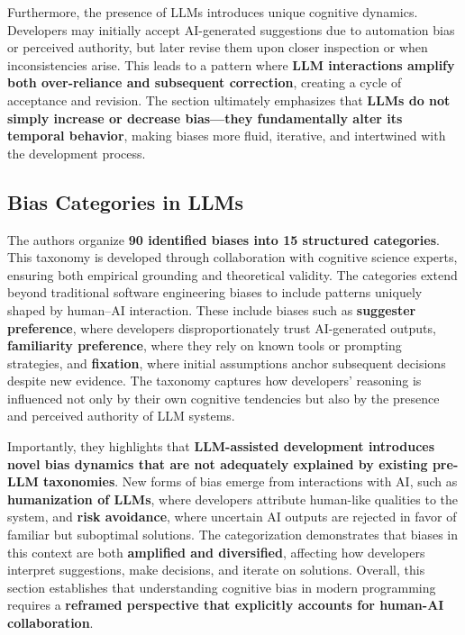Furthermore, the presence of LLMs introduces unique cognitive dynamics. Developers may initially accept AI-generated suggestions due to automation bias or perceived authority, but later revise them upon closer inspection or when inconsistencies arise. This leads to a pattern where \textbf{LLM interactions amplify both over-reliance and subsequent correction}, creating a cycle of acceptance and revision. The section ultimately emphasizes that \textbf{LLMs do not simply increase or decrease bias—they fundamentally alter its temporal behavior}, making biases more fluid, iterative, and intertwined with the development process.

\subsection{Bias Categories in LLMs}
The authors organize \textbf{90 identified biases into 15 structured categories}. This taxonomy is developed through collaboration with cognitive science experts, ensuring both empirical grounding and theoretical validity. The categories extend beyond traditional software engineering biases to include patterns uniquely shaped by human–AI interaction. These include biases such as \textbf{suggester preference}, where developers disproportionately trust AI-generated outputs, \textbf{familiarity preference}, where they rely on known tools or prompting strategies, and \textbf{fixation}, where initial assumptions anchor subsequent decisions despite new evidence. The taxonomy captures how developers’ reasoning is influenced not only by their own cognitive tendencies but also by the presence and perceived authority of LLM systems.

Importantly, they highlights that \textbf{LLM-assisted development introduces novel bias dynamics that are not adequately explained by existing pre-LLM taxonomies}. New forms of bias emerge from interactions with AI, such as \textbf{humanization of LLMs}, where developers attribute human-like qualities to the system, and \textbf{risk avoidance}, where uncertain AI outputs are rejected in favor of familiar but suboptimal solutions. The categorization demonstrates that biases in this context are both \textbf{amplified and diversified}, affecting how developers interpret suggestions, make decisions, and iterate on solutions. Overall, this section establishes that understanding cognitive bias in modern programming requires a \textbf{reframed perspective that explicitly accounts for human-AI collaboration}.

